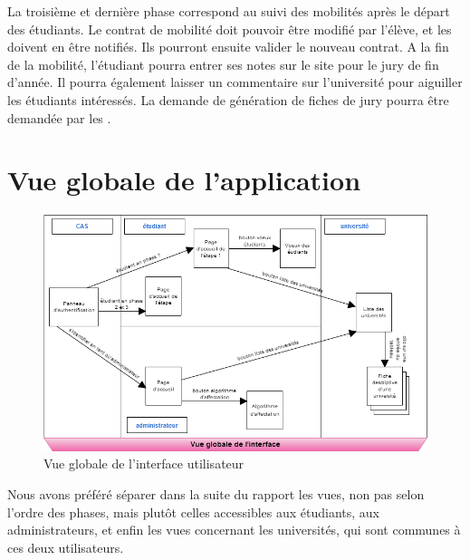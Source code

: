La troisième et dernière phase correspond au suivi des mobilités après le départ des étudiants. Le contrat de mobilité doit pouvoir être modifié par l'élève, et les \ris doivent en être notifiés. Ils pourront ensuite valider le nouveau contrat. A la fin de la mobilité, l'étudiant pourra entrer ses notes sur le site pour le jury de fin d'année. Il pourra également laisser un commentaire sur l'université pour aiguiller les étudiants intéressés. La demande de génération de fiches de jury pourra être demandée par les \ris.


\section{Vue globale de l'application}

\begin{figure}[H]
    \centering
    \includegraphics[angle=90,scale=0.7]{Annexe/vue_globale.png}
    \caption{Vue globale de l'interface utilisateur}
    \label{fig::vue_glob}
\end{figure}

\bigbreak

Nous avons préféré séparer dans la suite du rapport les vues, non pas selon l'ordre des phases, mais plutôt celles accessibles aux étudiants, aux administrateurs, et enfin les vues concernant les universités, qui sont communes à ces deux utilisateurs.

